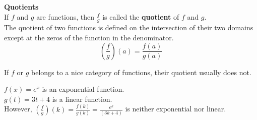 \documentclass{ximera}
\begin{document}
\begin{template}  \textbf{\textcolor{blue!55!black}{Quotients}} \\


If  $f$ and $g$ are functions, then $\frac{f}{g}$ is called the \textbf{\textcolor{green!50!black}{quotient}} of $f$ and $g$. \\

The quotient of two functions is defined on the intersection of their two domains except at the zeros of the function in the denominator. \\


\[ \left(\frac{f}{g}\right)(a) = \frac{f(a)}{g(a)}  \]



\end{template}



\begin{warning}

If $f$ or $g$ belongs to a nice category of functions, their quotient usually does not.

\end{warning}





\begin{example}

$f(x) = e^x$ is an exponential function. \\
$g(t) = 3 t + 4$ is a linear function. \\

However, $\left(\frac{f}{g}\right)(k) = \frac{f(k)}{g(k)} = \frac{e^k}{(3 k + 4)}$ is neither exponential nor linear.

\end{example}
\end{document}
